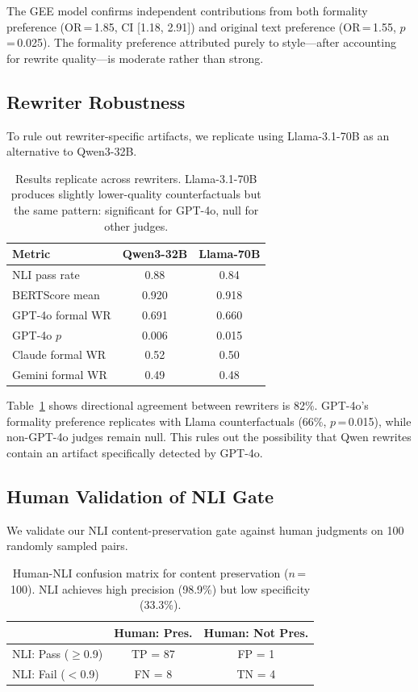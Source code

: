 \documentclass[11pt,a4paper]{article}
\begin{document}
The GEE model confirms independent contributions from both formality preference (OR\,=\,1.85, CI [1.18, 2.91]) and original text preference (OR\,=\,1.55, $p$\,=\,0.025).
The formality preference attributed purely to style---after accounting for rewrite quality---is moderate rather than strong.

\subsection{Rewriter Robustness}
\label{sec:rewriter}

To rule out rewriter-specific artifacts, we replicate using Llama-3.1-70B as an alternative to Qwen3-32B.

\begin{table}[t]
\centering
\small
\caption{Results replicate across rewriters. Llama-3.1-70B produces slightly lower-quality counterfactuals but the same pattern: significant for GPT-4o, null for other judges.}
\label{tab:rewriter}
\begin{tabular}{lcc}
\toprule
\textbf{Metric} & \textbf{Qwen3-32B} & \textbf{Llama-70B} \\
\midrule
NLI pass rate & 0.88 & 0.84 \\
BERTScore mean & 0.920 & 0.918 \\
GPT-4o formal WR & 0.691 & 0.660 \\
GPT-4o $p$ & 0.006 & 0.015 \\
Claude formal WR & 0.52 & 0.50 \\
Gemini formal WR & 0.49 & 0.48 \\
\bottomrule
\end{tabular}
\end{table}

Table~\ref{tab:rewriter} shows directional agreement between rewriters is 82\%.
GPT-4o's formality preference replicates with Llama counterfactuals (66\%, $p$\,=\,0.015), while non-GPT-4o judges remain null.
This rules out the possibility that Qwen rewrites contain an artifact specifically detected by GPT-4o.

\subsection{Human Validation of NLI Gate}
\label{sec:human_nli}

We validate our NLI content-preservation gate against human judgments on 100 randomly sampled pairs.

\begin{table}[t]
\centering
\small
\caption{Human-NLI confusion matrix for content preservation ($n$\,=\,100). NLI achieves high precision (98.9\%) but low specificity (33.3\%).}
\label{tab:human_nli}
\begin{tabular}{lcc}
\toprule
 & \textbf{Human: Pres.} & \textbf{Human: Not Pres.} \\
\midrule
NLI: Pass ($\geq$0.9) & TP = 87 & FP = 1 \\
NLI: Fail ($<$0.9) & FN = 8 & TN = 4 \\
\bottomrule
\end{tabular}
\end{table}
\end{document}
